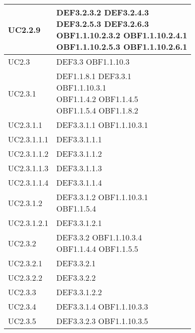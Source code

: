 \documentclass{scalatekids-article}
\begin{document}
\begin{longtable}[H]{|p{5.5cm}|p{5.5cm}|}
\hline
UC2.2.9 & \multiLineCell[t]{DEF3.2.3.2 DEF3.2.4.3\\DEF3.2.5.3 DEF3.2.6.3\\OBF1.1.10.2.3.2 OBF1.1.10.2.4.1\\OBF1.1.10.2.5.3 OBF1.1.10.2.6.1\\}\\
\hline
UC2.3 & \multiLineCell[t]{DEF3.3 OBF1.1.10.3\\}\\
\hline
UC2.3.1 & \multiLineCell[t]{DEF1.1.8.1 DEF3.3.1\\OBF1.1.10.3.1\\OBF1.1.4.2 OBF1.1.4.5\\OBF1.1.5.4 OBF1.1.8.2\\}\\
\hline
UC2.3.1.1 & \multiLineCell[t]{DEF3.3.1.1 OBF1.1.10.3.1\\}\\
\hline
UC2.3.1.1.1 & \multiLineCell[t]{DEF3.3.1.1.1\\}\\
\hline
UC2.3.1.1.2 & \multiLineCell[t]{DEF3.3.1.1.2\\}\\
\hline
UC2.3.1.1.3 & \multiLineCell[t]{DEF3.3.1.1.3\\}\\
\hline
UC2.3.1.1.4 & \multiLineCell[t]{DEF3.3.1.1.4\\}\\
\hline
UC2.3.1.2 & \multiLineCell[t]{DEF3.3.1.2 OBF1.1.10.3.1\\OBF1.1.5.4}\\
\hline
UC2.3.1.2.1 & \multiLineCell[t]{DEF3.3.1.2.1\\}\\
\hline
UC2.3.2 & \multiLineCell[t]{DEF3.3.2 OBF1.1.10.3.4\\OBF1.1.4.4 OBF1.1.5.5\\}\\
\hline
UC2.3.2.1 & \multiLineCell[t]{DEF3.3.2.1\\}\\
\hline
UC2.3.2.2 & \multiLineCell[t]{DEF3.3.2.2\\}\\
\hline
UC2.3.3 & \multiLineCell[t]{DEF3.3.1.2.2\\}\\
\hline
UC2.3.4 & \multiLineCell[t]{DEF3.3.1.4 OBF1.1.10.3.3\\}\\
\hline
UC2.3.5 & \multiLineCell[t]{DEF3.3.2.3 OBF1.1.10.3.5\\}\\

\end{longtable}
\end{document}
